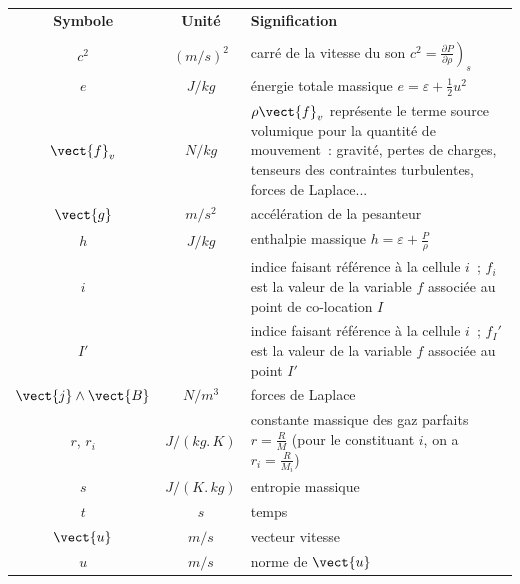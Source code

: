 \clearpage

\begin{table}[htp]
\begin{tabular}{ccp{}}

{\bf Symbole} & {\bf Unité} & {\bf Signification}\\

\phantom{$C_v$, ${C_v}_i$} & \phantom{$\lbrack f\rbrack.\,kg/(m^3.\,s)$} & \\

$c^2$                 & $(m/s)^2$         & carré de la vitesse du son
                $c^2 = \left.\frac{\partial P}{\partial \rho}\right)_s$\\
$e$                 & $J/kg$         & énergie totale massique
                                        $e = \varepsilon + \frac{1}{2}u^2$\\
$\vect{f}_v$         & $N/kg$         & $\rho\vect{f}_v$ représente le terme
                                        source volumique pour la quantité
                                        de mouvement~: gravité, pertes
                                        de charges, tenseurs des contraintes
                                        turbulentes, forces de Laplace...\\
$\vect{g}$         & $m/s^2$         & accélération de la pesanteur\\
$h$                 & $J/kg$         & enthalpie massique
                                        $h=\varepsilon + \frac{P}{\rho}$\\
$i$                 &                  & indice faisant référence à la
                                        cellule $i$~; $f_i$ est la valeur
                                        de la variable $f$ associée
                                        au point de co-location $I$\\
$I'$                 &                  & indice faisant référence à la
                                        cellule $i$~; $f_I'$ est la valeur
                                        de la variable $f$ associée
                                        au point $I'$\\
$\vect{j}\wedge\vect{B}$
                & $N/m^3$         & forces de Laplace\\
$r$, $r_i$         & $J/(kg.\,K)$         & constante massique des gaz parfaits
                                        $r = \frac{R}{M}$
                                        (pour le constituant $i$, on a $r_i=\frac{R}{M_i}$)\\
$s$                 & $J/(K.\,kg)$         & entropie massique\\
$t$                 & $s$                 & temps\\
$\vect{u}$         & $m/s$         & vecteur vitesse\\
$u$                 & $m/s$         & norme de $\vect{u}$\\

\end{tabular}
\end{table}


